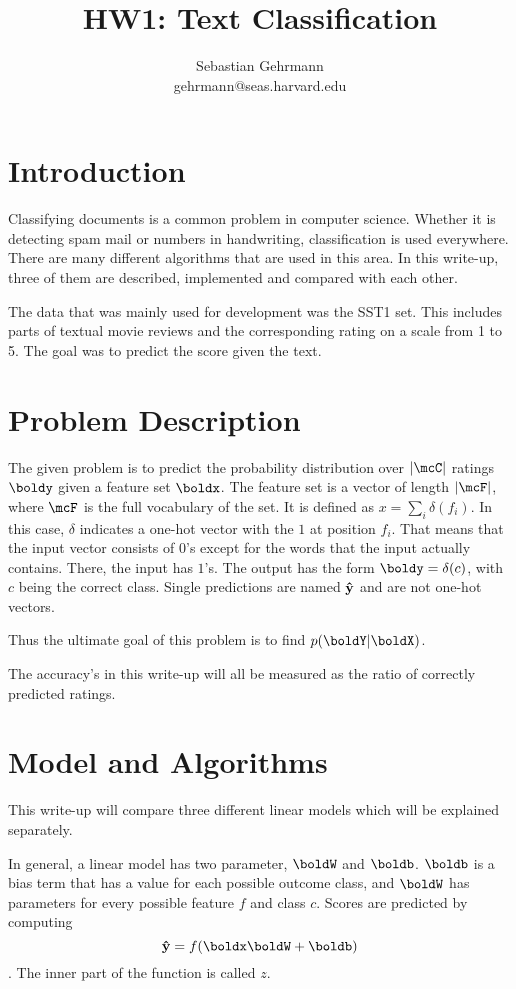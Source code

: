 \documentclass[11pt]{article}
\title{HW1: Text Classification}
\author{Sebastian Gehrmann \\ gehrmann@seas.harvard.edu }
\begin{document}
\maketitle{}
\section{Introduction}

Classifying documents is a common problem in computer science. Whether it is detecting spam mail or numbers in handwriting, classification is used everywhere. There are many different algorithms that are used in this area. In this write-up, three of them are described, implemented and compared with each other. 

The data that was mainly used for development was the SST1 set. This includes parts of textual movie reviews and the corresponding rating on a scale from 1 to 5. The goal was to predict the score given the text.

\section{Problem Description}

The given problem is to predict the probability distribution over $|\mcC|$  ratings $\boldy$ given a feature set $\boldx$. The feature set is a vector of length $|\mcF|$, where $\mcF$ is the full vocabulary of the set. It is defined as $x=\sum_i\delta(f_i)$. In this case, $\delta$ indicates a one-hot vector with the $1$ at position $f_i$. That means that the input vector consists of $0$'s except for the words that the input actually contains. There, the input has $1$'s.
The output has the form $\boldy=\delta(c)$, with $c$ being the correct class. Single predictions are named $\bold{\hat{y}}$ and are not one-hot vectors.

Thus the ultimate goal of this problem is to find $p(\boldY|\boldX)$. 

The accuracy's in this write-up will all be measured as the ratio of correctly predicted ratings.
 


\section{Model and Algorithms}

This write-up will compare three different linear models which will be explained separately. 

In general, a linear model has two parameter, $\boldW$ and $\boldb$. $\boldb$ is a bias term that has a value for each possible outcome class, and $\boldW$ has parameters for every possible feature $f$ and class $c$. Scores are predicted by computing 
$$\bold{\hat{y}} = f(\boldx\boldW + \boldb)$$. The inner part of the function is called $z$.
\end{document}
